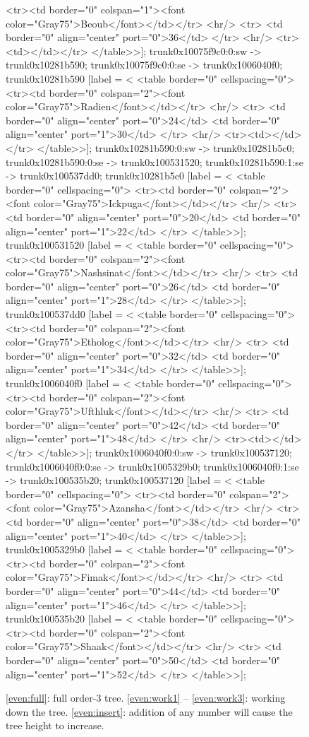 \documentclass[12pt]{article}
\begin{document}
\begin{figure}
{{	<tr><td border="0" colspan="1"><font color="Gray75">Beoub</font></td></tr>
	<hr/>
	<tr>
	<td border="0" align="center" port="0">36</td>
	</tr>
	<hr/>
	<tr><td></td></tr>
</table>>];
	trunk0x10075f9c0:0:sw -> trunk0x10281b590;
	trunk0x10075f9c0:0:se -> trunk0x1006040f0;
	trunk0x10281b590 [label = <
<table border="0" cellspacing="0">
	<tr><td border="0" colspan="2"><font color="Gray75">Radien</font></td></tr>
	<hr/>
	<tr>
	<td border="0" align="center" port="0">24</td>
	<td border="0" align="center" port="1">30</td>
	</tr>
	<hr/>
	<tr><td></td></tr>
</table>>];
	trunk0x10281b590:0:sw -> trunk0x10281b5c0;
	trunk0x10281b590:0:se -> trunk0x100531520;
	trunk0x10281b590:1:se -> trunk0x100537dd0;
	trunk0x10281b5c0 [label = <
<table border="0" cellspacing="0">
	<tr><td border="0" colspan="2"><font color="Gray75">Ickpuga</font></td></tr>
	<hr/>
	<tr>
	<td border="0" align="center" port="0">20</td>
	<td border="0" align="center" port="1">22</td>
	</tr>
</table>>];
	trunk0x100531520 [label = <
<table border="0" cellspacing="0">
	<tr><td border="0" colspan="2"><font color="Gray75">Nashsinat</font></td></tr>
	<hr/>
	<tr>
	<td border="0" align="center" port="0">26</td>
	<td border="0" align="center" port="1">28</td>
	</tr>
</table>>];
	trunk0x100537dd0 [label = <
<table border="0" cellspacing="0">
	<tr><td border="0" colspan="2"><font color="Gray75">Etholog</font></td></tr>
	<hr/>
	<tr>
	<td border="0" align="center" port="0">32</td>
	<td border="0" align="center" port="1">34</td>
	</tr>
</table>>];
	trunk0x1006040f0 [label = <
<table border="0" cellspacing="0">
	<tr><td border="0" colspan="2"><font color="Gray75">Ufthluk</font></td></tr>
	<hr/>
	<tr>
	<td border="0" align="center" port="0">42</td>
	<td border="0" align="center" port="1">48</td>
	</tr>
	<hr/>
	<tr><td></td></tr>
</table>>];
	trunk0x1006040f0:0:sw -> trunk0x100537120;
	trunk0x1006040f0:0:se -> trunk0x1005329b0;
	trunk0x1006040f0:1:se -> trunk0x100535b20;
	trunk0x100537120 [label = <
<table border="0" cellspacing="0">
	<tr><td border="0" colspan="2"><font color="Gray75">Azansha</font></td></tr>
	<hr/>
	<tr>
	<td border="0" align="center" port="0">38</td>
	<td border="0" align="center" port="1">40</td>
	</tr>
</table>>];
	trunk0x1005329b0 [label = <
<table border="0" cellspacing="0">
	<tr><td border="0" colspan="2"><font color="Gray75">Fimak</font></td></tr>
	<hr/>
	<tr>
	<td border="0" align="center" port="0">44</td>
	<td border="0" align="center" port="1">46</td>
	</tr>
</table>>];
	trunk0x100535b20 [label = <
<table border="0" cellspacing="0">
	<tr><td border="0" colspan="2"><font color="Gray75">Shaak</font></td></tr>
	<hr/>
	<tr>
	<td border="0" align="center" port="0">50</td>
	<td border="0" align="center" port="1">52</td>
	</tr>
</table>>];
		}
	}
    \caption{\ref{even:full}: full order-3 tree. \ref{even:work1} -- \ref{even:work3}: working down the tree. \ref{even:insert}: addition of any number will cause the tree height to increase.}%
	\label{even}%
\end{figure}%
\end{document}
